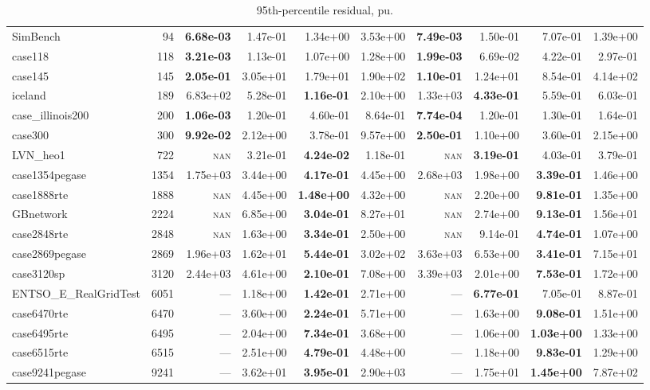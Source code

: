 \documentclass[10pt]{article}
\begin{document}
\begin{table}[H]
\begin{tabular}{lr rrrr rrrr}
SimBench & 94 & \textbf{6.68e-03} & 1.47e-01 & 1.34e+00 & 3.53e+00 & \textbf{7.49e-03} & 1.50e-01 & 7.07e-01 & 1.39e+00 \\
case118 & 118 & \textbf{3.21e-03} & 1.13e-01 & 1.07e+00 & 1.28e+00 & \textbf{1.99e-03} & 6.69e-02 & 4.22e-01 & 2.97e-01 \\
case145 & 145 & \textbf{2.05e-01} & 3.05e+01 & 1.79e+01 & 1.90e+02 & \textbf{1.10e-01} & 1.24e+01 & 8.54e-01 & 4.14e+02 \\
iceland & 189 & 6.83e+02 & 5.28e-01 & \textbf{1.16e-01} & 2.10e+00 & 1.33e+03 & \textbf{4.33e-01} & 5.59e-01 & 6.03e-01 \\
case\_illinois200 & 200 & \textbf{1.06e-03} & 1.20e-01 & 4.60e-01 & 8.64e-01 & \textbf{7.74e-04} & 1.20e-01 & 1.30e-01 & 1.64e-01 \\
case300 & 300 & \textbf{9.92e-02} & 2.12e+00 & 3.78e-01 & 9.57e+00 & \textbf{2.50e-01} & 1.10e+00 & 3.60e-01 & 2.15e+00 \\
LVN\_heo1 & 722 & \textsc{nan} & 3.21e-01 & \textbf{4.24e-02} & 1.18e-01 & \textsc{nan} & \textbf{3.19e-01} & 4.03e-01 & 3.79e-01 \\
case1354pegase & 1354 & 1.75e+03 & 3.44e+00 & \textbf{4.17e-01} & 4.45e+00 & 2.68e+03 & 1.98e+00 & \textbf{3.39e-01} & 1.46e+00 \\
case1888rte & 1888 & \textsc{nan} & 4.45e+00 & \textbf{1.48e+00} & 4.32e+00 & \textsc{nan} & 2.20e+00 & \textbf{9.81e-01} & 1.35e+00 \\
GBnetwork & 2224 & \textsc{nan} & 6.85e+00 & \textbf{3.04e-01} & 8.27e+01 & \textsc{nan} & 2.74e+00 & \textbf{9.13e-01} & 1.56e+01 \\
case2848rte & 2848 & \textsc{nan} & 1.63e+00 & \textbf{3.34e-01} & 2.50e+00 & \textsc{nan} & 9.14e-01 & \textbf{4.74e-01} & 1.07e+00 \\
case2869pegase & 2869 & 1.96e+03 & 1.62e+01 & \textbf{5.44e-01} & 3.02e+02 & 3.63e+03 & 6.53e+00 & \textbf{3.41e-01} & 7.15e+01 \\
case3120sp & 3120 & 2.44e+03 & 4.61e+00 & \textbf{2.10e-01} & 7.08e+00 & 3.39e+03 & 2.01e+00 & \textbf{7.53e-01} & 1.72e+00 \\
ENTSO\_E\_RealGridTest & 6051 & --- & 1.18e+00 & \textbf{1.42e-01} & 2.71e+00 & --- & \textbf{6.77e-01} & 7.05e-01 & 8.87e-01 \\
case6470rte & 6470 & --- & 3.60e+00 & \textbf{2.24e-01} & 5.71e+00 & --- & 1.63e+00 & \textbf{9.08e-01} & 1.51e+00 \\
case6495rte & 6495 & --- & 2.04e+00 & \textbf{7.34e-01} & 3.68e+00 & --- & 1.06e+00 & \textbf{1.03e+00} & 1.33e+00 \\
case6515rte & 6515 & --- & 2.51e+00 & \textbf{4.79e-01} & 4.48e+00 & --- & 1.18e+00 & \textbf{9.83e-01} & 1.29e+00 \\
case9241pegase & 9241 & --- & 3.62e+01 & \textbf{3.95e-01} & 2.90e+03 & --- & 1.75e+01 & \textbf{1.45e+00} & 7.87e+02 \\
\bottomrule
\end{tabular}
\caption{95th-percentile residual, pu.}
\end{table}
\end{document}
